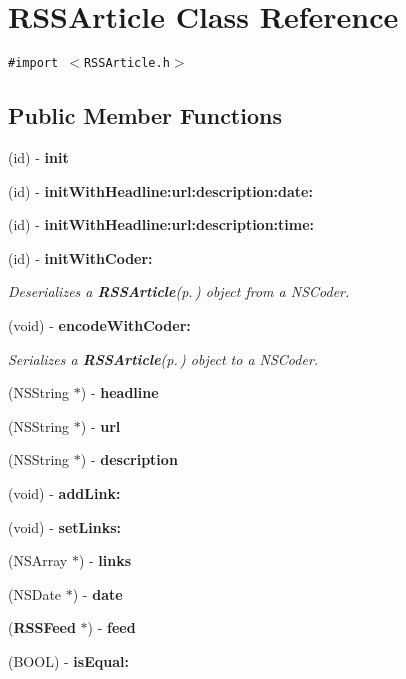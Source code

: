 \section{RSSArticle Class Reference}
\label{interfaceRSSArticle}
{\tt \#import $<$RSSArticle.h$>$}

\subsection*{Public Member Functions}
\begin{CompactItemize}
\item 
(id) - {\bf init}
\item 
(id) - {\bf init\-With\-Headline:url:description:date:}
\item 
(id) - {\bf init\-With\-Headline:url:description:time:}
\item 
(id) - {\bf init\-With\-Coder:}\label{interfaceRSSArticle_6984252682d7e137046486ffff11dd49}

\begin{CompactList}\small\item\em Deserializes a {\bf RSSArticle}{\rm (p.\,\pageref{interfaceRSSArticle})} object from a NSCoder. \item\end{CompactList}\item 
(void) - {\bf encode\-With\-Coder:}\label{interfaceRSSArticle_f3209eed527bf05309bcc99c54908d4d}

\begin{CompactList}\small\item\em Serializes a {\bf RSSArticle}{\rm (p.\,\pageref{interfaceRSSArticle})} object to a NSCoder. \item\end{CompactList}\item 
(NSString $\ast$) - {\bf headline}
\item 
(NSString $\ast$) - {\bf url}
\item 
(NSString $\ast$) - {\bf description}
\item 
(void) - {\bf add\-Link:}
\item 
(void) - {\bf set\-Links:}
\item 
(NSArray $\ast$) - {\bf links}
\item 
(NSDate $\ast$) - {\bf date}
\item 
({\bf RSSFeed} $\ast$) - {\bf feed}
\item 
(BOOL) - {\bf is\-Equal:}
\end{CompactItemize}


